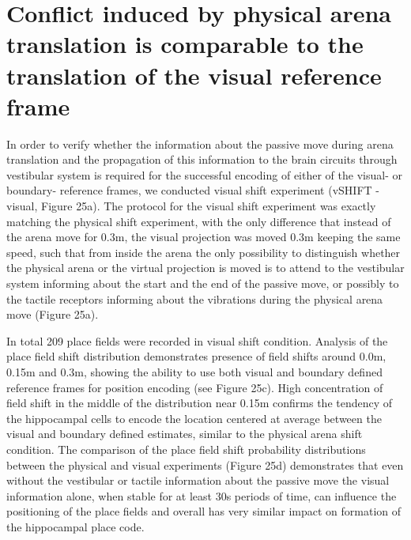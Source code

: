 \section[Conflict induced by visual versus physical translation]{Conflict induced by physical arena translation is comparable to the translation of the visual reference frame%
              }
\label{sec:visual_physical_equal}

In order to verify whether the information about the passive move during arena translation and the propagation of this information to the brain circuits through vestibular system is required for the successful encoding of either of the visual- or boundary- reference frames, we conducted visual shift experiment (vSHIFT - visual, Figure 25a). The protocol for the visual shift experiment was exactly matching the physical shift experiment, with the only difference that instead of the arena move for 0.3m, the visual projection was moved 0.3m keeping the same speed, such that from inside the arena the only possibility to distinguish whether the physical arena or the virtual projection is moved is to attend to the vestibular system informing about the start and the end of the passive move, or possibly to the tactile receptors informing about the vibrations during the physical arena move (Figure 25a).

In total 209 place fields were recorded in visual shift condition. Analysis of the place field shift distribution demonstrates presence of field shifts around 0.0m, 0.15m and 0.3m, showing the ability to use both visual and boundary defined reference frames for position encoding (see Figure 25c). High concentration of field shift in the middle of the distribution near 0.15m confirms the tendency of the hippocampal cells to encode the location centered at average between the visual and boundary defined estimates, similar to the physical arena shift condition. The comparison of the place field shift probability distributions between the physical and visual experiments (Figure 25d) demonstrates that even without the vestibular or tactile information about the passive move the visual information alone, when stable for at least 30s periods of time, can influence the positioning of the place fields and overall has very similar impact on formation of the hippocampal place code.


